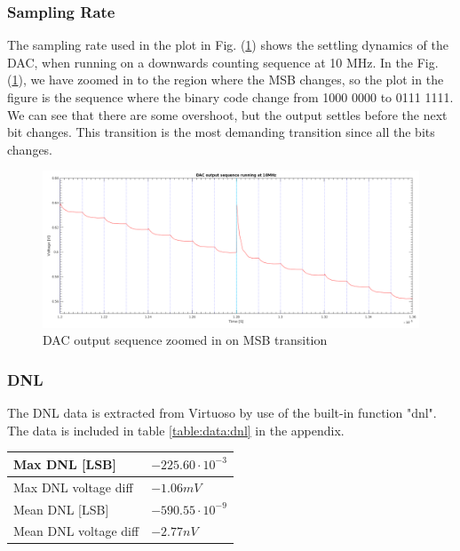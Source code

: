\documentclass[english, 12pt, a4paper]{ifimaster}
\begin{document}
\subsubsection{Sampling Rate}
The sampling rate used in the plot in Fig. (\ref{figure:dac:closeup}) shows the settling dynamics of the DAC, when running on a downwards counting sequence at 10 MHz.
In the Fig. (\ref{figure:dac:closeup}), we have zoomed in to the region where the MSB changes, so the plot in the figure is the sequence where the binary code change from 1000 0000 to 0111 1111. 
We can see that there are some overshoot, but the output settles before the next bit changes. 
This transition is the most demanding transition since all the bits changes.
\begin{figure}[!ht]
 \centering     
 \includegraphics[width=\textwidth]{img/dac/dac_running_at_10MHz_closeup_at_center}
 \caption{DAC output sequence zoomed in on MSB transition}
 \label{figure:dac:closeup}
\end{figure}

\subsubsection{DNL}

The DNL data is extracted from Virtuoso by use of the built-in function "dnl". 
The data is included in table \ref{table:data:dnl} in the appendix.

\begin{tabular}[t]{|l|l|}
 \hline 
  
Max DNL [LSB] & \(-225.60 \cdot 10^{-3} \) \\ \hline
Max DNL voltage diff & \(-1.06 mV \) \\ \hline

Mean DNL [LSB] & \(-590.55 \cdot 10^{-9}\) \\ \hline
Mean DNL voltage diff & \(-2.77 nV \) \\ \hline
\end{tabular}
\end{document}

